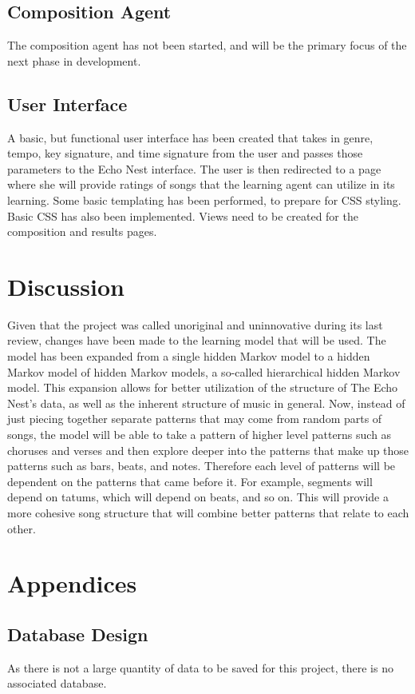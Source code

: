 \documentclass{article}
\begin{document}
\subsection{Composition Agent}
The composition agent has not been started, and will be the primary focus of the next phase in development.

\subsection{User Interface}
A basic, but functional user interface has been created that takes in genre, tempo, key signature, and time
signature from the user and passes those parameters to the Echo Nest interface. The user is then redirected
to a page where she will provide ratings of songs that the learning agent can utilize in its learning. Some
basic templating has been performed, to prepare for CSS styling. Basic CSS has also been implemented. Views
need to be created for the composition and results pages.

\section{Discussion}
Given that the project was called unoriginal and uninnovative during its last review, changes have been 
made to the learning model that will be used. The model has been expanded from a single hidden Markov model to 
a hidden Markov model of hidden Markov models, a so-called hierarchical hidden Markov model. This expansion
allows for better utilization of the structure of The Echo Nest's data, as well as the inherent structure of
music in general. Now, instead of just piecing together separate patterns that may come from random parts of
songs, the model will be able to take a pattern of higher level patterns such as choruses and verses and then 
explore deeper into the patterns that make up those patterns such as bars, beats, and notes. Therefore each 
level of patterns will be dependent on the patterns that came before it. For example, segments will depend on 
tatums, which will depend on beats, and so on. This will provide a more cohesive song structure that will
combine better patterns that relate to each other.

\newpage

\section{Appendices}
\subsection{Database Design}
As there is not a large quantity of data to be saved for this project, there is no associated 
database.
\end{document}
